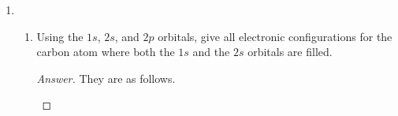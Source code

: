 \documentclass[../psets.tex]{subfiles}
\begin{document}
\begin{enumerate}
\begin{enumerate}
\begin{proof}[Answer]
\begin{align*}
            \end{align*}
            Thus, our approximation for the ground-state energy according to first-order perturbation theory is
            \begin{align*}
                E_0 &= E_0^{(0)}+\lambda E_0^{(1)}\\
                &= \frac{\hbar}{2\sqrt{m}}+\frac{\hbar}{10\sqrt{m}}\\
                &= \frac{3\hbar}{5\sqrt{m}}\\
                &= \SI{0.6000}{\atomicunit}
            \end{align*}
            Since our variational energy $E_\phi$ must be greater than or equal to the actual energy, and $E_0$ is even greater than $E_\phi$,  than our first-order perturbation theory calculation $E_0$.
        \end{proof}
    \end{enumerate}
    \item 
    \begin{enumerate}
        \item Using the $1s$, $2s$, and $2p$ orbitals, give all electronic configurations for the carbon atom where both the $1s$ and the $2s$ orbitals are filled.
        \begin{proof}[Answer]
            They are as follows.
            \begin{figure}[h!]
                \centering
                \footnotesize
                \begin{subfigure}[b]{0.19\linewidth}
                    \centering

\end{subfigure}
\end{figure}
\end{proof}
\end{enumerate}
\end{enumerate}
\end{document}

